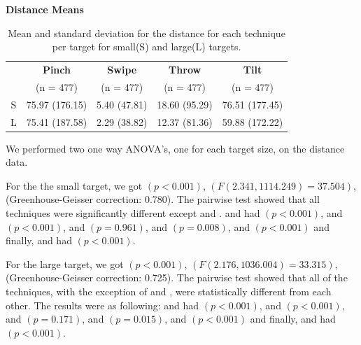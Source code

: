 \begin{table}[H]
	\centering
	\textbf{Distance Means}\\[4pt]
	\begin{adjustbox}{width=\columnwidth}
	\begin{tabular}{|c|c|c|c|c|}
		\hline
		\rowcolor[HTML]{9B9B9B} 
		& \textbf{Pinch} & \textbf{Swipe} & \textbf{Throw} & \textbf{Tilt} \\
		\rowcolor[HTML]{9B9B9B} 
		& (n = 477) & (n = 477) & (n = 477) & (n = 477) \\ \hline
		S & 75.97 (176.15) & 5.40 (47.81) & 18.60 (95.29)  & 76.51  (177.45) \\ \hline
		L & 75.41 (187.58) & 2.29 (38.82) & 12.37 (81.36) & 59.88 (172.22) \\ \hline
	\end{tabular}
	\end{adjustbox}
	\caption{Mean and standard deviation for the distance for each technique per target for small(S) and large(L) targets.}
	\label{tab:distance}
\end{table}

We performed two one way ANOVA's, one for each target size, on the distance data.

For the the small target, we got $(p<0.001)$, $(F(2.341, 1114.249)=37.504)$, (Greenhouse-Geisser correction: 0.780).
The pairwise test showed that all techniques were significantly different except \pinch and \tilt. 
\pinch and \swipe had $(p < 0.001)$, 
\pinch and \throw $(p <0.001)$, 
\pinch and \tilt $(p = 0.961)$, 
\swipe and \throw $(p = 0.008)$, 
\swipe and \tilt $(p < 0.001)$ and finally, 
\throw and \tilt had $(p < 0.001)$. 

For the large target, we got $(p<0.001)$, $(F(2.176, 1036.004)=33.315)$, (Greenhouse-Geisser correction: 0.725).
The pairwise test showed that all of the techniques, with the exception of \pinch and \tilt, were statistically different from each other. The results were as following: 
\pinch and \swipe had $(p < 0.001)$, 
\pinch and \throw $(p <0.001)$, 
\pinch and \tilt $(p = 0.171)$, 
\swipe and \throw $(p = 0.015)$, 
\swipe and \tilt $(p < 0.001)$ and finally, 
\throw and \tilt had $(p < 0.001)$. 

